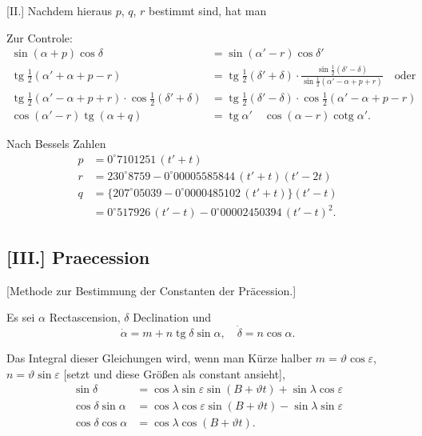 \documentclass[12pt,a4paper]{article}
\theoremstyle{plain}
\theoremstyle{definition}
\theoremstyle{remark}
\DeclareMathOperator{\tg}{tg}
\DeclareMathOperator{\cotg}{cotg}
\begin{document}
[II.] Nachdem hieraus $p$, $q$, $r$ bestimmt sind, hat man

Zur Controle:
\begin{align}
\sin(\alpha + p)\cos\delta &= \sin(\alpha' - r)\cos\delta' \\
\tg\tfrac{1}{2}(\alpha' + \alpha + p - r) &= \tg\tfrac{1}{2}(\delta' + \delta) \cdot \tfrac{\sin\tfrac{1}{2}(\delta' - \delta)}{\sin\tfrac{1}{2}(\alpha' - \alpha + p + r)} \quad \text{oder} \\
\tg\tfrac{1}{2}(\alpha' - \alpha + p + r) \cdot \cos\tfrac{1}{2}(\delta' + \delta) &= \tg\tfrac{1}{2}(\delta' - \delta) \cdot \cos\tfrac{1}{2}(\alpha' - \alpha + p - r) \\
\cos(\alpha' - r)\tg(\alpha + q) &= \tg\alpha' \quad \cos(\alpha - r)\cotg\alpha'.
\end{align}

Nach Bessels Zahlen
\begin{align*}
p &= 0^{\circ}7101251\,(t' + t) \\
r &= 230^{\circ}8759 - 0^{\circ}00005585844\,(t' + t)(t' - 2t) \\
q &= \{207^{\circ}05039 - 0^{\circ}0000485102\,(t' + t)\}(t' - t) \\
  &= 0^{\circ}517926\,(t' - t) - 0^{\circ}00002450394\,(t' - t)^2.
\end{align*}

\newpage

\subsection*{[III.] Praecession}

[Methode zur Bestimmung der Constanten der Pr\"acession.]

Es sei $\alpha$ Rectascension, $\delta$ Declination und
\[
\dot{\alpha} = m + n\tg\delta\sin\alpha, \quad \dot{\delta} = n\cos\alpha.
\]

Das Integral dieser Gleichungen wird, wenn man K\"urze halber $m = \vartheta\cos\varepsilon$, $n = \vartheta\sin\varepsilon$ [setzt und diese Gr\"o\ss en als constant ansieht],
\begin{align*}
\sin\delta &= \cos\lambda \sin\varepsilon \sin(B + \vartheta t) + \sin\lambda\cos\varepsilon \\
\cos\delta\sin\alpha &= \cos\lambda\cos\varepsilon \sin(B + \vartheta t) - \sin\lambda\sin\varepsilon \\
\cos\delta\cos\alpha &= \cos\lambda\cos(B + \vartheta t).
\end{align*}
\end{document}
